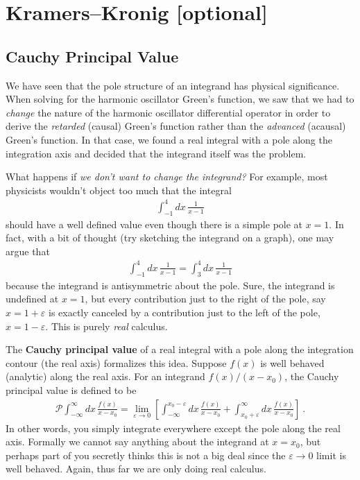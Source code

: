 
\section{Kramers--Kronig [optional]}

\subsection{Cauchy Principal Value}

We have seen that the pole structure of an integrand has physical significance. When solving for the harmonic oscillator Green's function, we saw that we had to \emph{change} the nature of the harmonic oscillator differential operator in order to derive the \emph{retarded} (causal) Green's function rather than the \emph{advanced} (acausal) Green's function. In that case, we found a real integral with a pole along the integration axis and decided that the integrand itself was the problem.

What happens if \emph{we don't want to change the integrand?} For example, most physicists wouldn't object too much that the integral
\begin{align}
	\int_{-1}^4 dx\, \frac{1}{x-1}
\end{align}
should have a well defined value even though there is a simple pole at $x=1$. In fact, with a bit of thought (try sketching the integrand on a graph), one may argue that
\begin{align}
	\int_{-1}^4 dx\, \frac{1}{x-1}
	= 
	\int_{3}^4 dx\, \frac{1}{x-1}
\end{align}
because the integrand is antisymmetric about the pole. Sure, the integrand is undefined at $x=1$, but every contribution just to the right of the pole, say $x=1+\varepsilon$ is exactly canceled by a contribution just to the left of the pole, $x=1-\varepsilon$. This is purely \emph{real} calculus.

The \textbf{Cauchy principal value} of a real integral with a pole along the integration contour (the real axis) formalizes this idea. Suppose $f(x)$ is well behaved (analytic) along the real axis. For an integrand $f(x)/(x-x_0)$, the Cauchy principal value is defined to be
\begin{align}
	\mathcal P \int_{-\infty}^\infty dx\, \frac{f(x)}{x-x_0}
	= 
	\lim_{\varepsilon\to 0}
	\left[
	\int_{-\infty}^{x_0-\varepsilon} dx\, \frac{f(x)}{x-x_0}
	+\int_{x_0+\varepsilon}^\infty dx\, \frac{f(x)}{x-x_0}
	\right] \ .
\end{align}
In other words, you simply integrate everywhere except the pole along the real axis. Formally we cannot say anything about the integrand at $x=x_0$, but perhaps part of you secretly thinks this is not a big deal since the $\varepsilon\to 0$ limit is well behaved. Again, thus far we are only doing real calculus.

